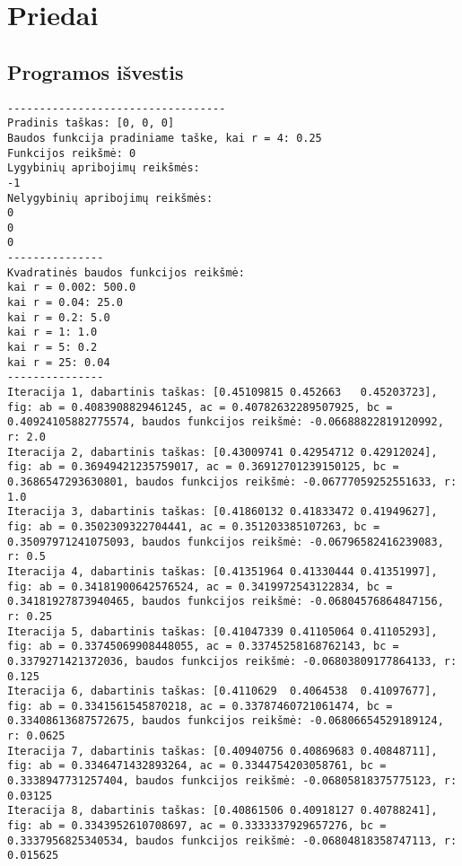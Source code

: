 \documentclass[a4paper,12pt,fleqn]{article}
\begin{document}
\pagebreak
\section{Priedai}

\subsection{Programos išvestis} \label{output}

\begin{verbatim}
----------------------------------
Pradinis taškas: [0, 0, 0]
Baudos funkcija pradiniame taške, kai r = 4: 0.25
Funkcijos reikšmė: 0
Lygybinių apribojimų reikšmės:
-1
Nelygybinių apribojimų reikšmės:
0
0
0
---------------
Kvadratinės baudos funkcijos reikšmė: 
kai r = 0.002: 500.0
kai r = 0.04: 25.0
kai r = 0.2: 5.0
kai r = 1: 1.0
kai r = 5: 0.2
kai r = 25: 0.04
---------------
Iteracija 1, dabartinis taškas: [0.45109815 0.452663   0.45203723], fig: ab = 0.4083908829461245, ac = 0.40782632289507925, bc = 0.40924105882775574, baudos funkcijos reikšmė: -0.06688822819120992, r: 2.0
Iteracija 2, dabartinis taškas: [0.43009741 0.42954712 0.42912024], fig: ab = 0.36949421235759017, ac = 0.36912701239150125, bc = 0.3686547293630801, baudos funkcijos reikšmė: -0.06777059252551633, r: 1.0
Iteracija 3, dabartinis taškas: [0.41860132 0.41833472 0.41949627], fig: ab = 0.3502309322704441, ac = 0.351203385107263, bc = 0.35097971241075093, baudos funkcijos reikšmė: -0.06796582416239083, r: 0.5
Iteracija 4, dabartinis taškas: [0.41351964 0.41330444 0.41351997], fig: ab = 0.34181900642576524, ac = 0.3419972543122834, bc = 0.34181927873940465, baudos funkcijos reikšmė: -0.06804576864847156, r: 0.25
Iteracija 5, dabartinis taškas: [0.41047339 0.41105064 0.41105293], fig: ab = 0.33745069908448055, ac = 0.33745258168762143, bc = 0.3379271421372036, baudos funkcijos reikšmė: -0.06803809177864133, r: 0.125
Iteracija 6, dabartinis taškas: [0.4110629  0.4064538  0.41097677], fig: ab = 0.3341561545870218, ac = 0.33787460721061474, bc = 0.33408613687572675, baudos funkcijos reikšmė: -0.06806654529189124, r: 0.0625
Iteracija 7, dabartinis taškas: [0.40940756 0.40869683 0.40848711], fig: ab = 0.3346471432893264, ac = 0.3344754203058761, bc = 0.3338947731257404, baudos funkcijos reikšmė: -0.06805818375775123, r: 0.03125
Iteracija 8, dabartinis taškas: [0.40861506 0.40918127 0.40788241], fig: ab = 0.3343952610708697, ac = 0.3333337929657276, bc = 0.3337956825340534, baudos funkcijos reikšmė: -0.06804818358747113, r: 0.015625

\end{verbatim}
\end{document}
